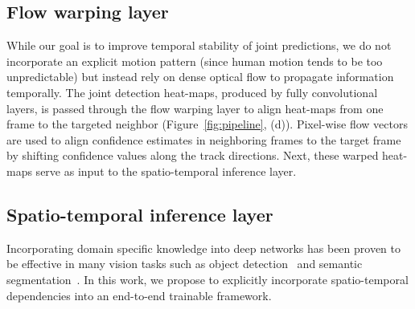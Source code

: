 \documentclass[10pt,twocolumn,letterpaper]{article}
\newcommand{\figref}[1]{Figure~\ref{#1}}
\begin{document}
\subsection{Flow warping layer}\label{subsection:flow-layer}
While our goal is to improve temporal stability of joint predictions, we do not incorporate an explicit motion pattern (since human motion tends to be too unpredictable) but instead rely on dense optical flow to propagate information temporally. The joint detection heat-maps, produced by fully convolutional layers, is passed through the flow warping layer to align heat-maps from one frame to the targeted neighbor (\figref{fig:pipeline}, (d)). 
Pixel-wise flow vectors are used to align confidence estimates in neighboring frames to the target frame by shifting confidence values along the track directions. Next, these warped heat-maps serve as input to the spatio-temporal inference layer.

\subsection{Spatio-temporal inference layer}\noindent Incorporating domain specific knowledge into deep networks has been proven to be effective in many vision tasks such as object detection~\cite{girshick2015deformable} and semantic segmentation~\cite{zheng2015conditional}. In this work, we propose to explicitly incorporate spatio-temporal dependencies into an end-to-end trainable framework.\\
\end{document}
